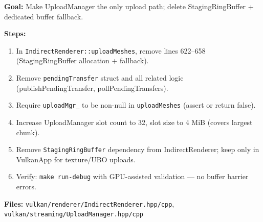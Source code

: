 \documentclass[11pt,a4paper]{article}
\begin{document}
\begin{tcolorbox}[promptbox={Prompt: Remove StagingRingBuffer Fallback from IndirectRenderer}]
\textbf{Goal:} Make UploadManager the only upload path; delete StagingRingBuffer + dedicated buffer fallback.

\textbf{Steps:}
\begin{enumerate}
    \item In \texttt{IndirectRenderer::uploadMeshes}, remove lines 622–658 (StagingRingBuffer allocation + fallback).
    \item Remove \texttt{pendingTransfer} struct and all related logic (publishPendingTransfer, pollPendingTransfers).
    \item Require \texttt{uploadMgr\_} to be non-null in \texttt{uploadMeshes} (assert or return false).
    \item Increase UploadManager slot count to 32, slot size to 4 MiB (covers largest chunk).
    \item Remove \texttt{StagingRingBuffer} dependency from IndirectRenderer; keep only in VulkanApp for texture/UBO uploads.
    \item Verify: \texttt{make run-debug} with GPU-assisted validation — no buffer barrier errors.
\end{enumerate}

\textbf{Files:} \texttt{vulkan/renderer/IndirectRenderer.hpp/cpp}, \texttt{vulkan/streaming/UploadManager.hpp/cpp}
\end{tcolorbox}
\end{document}
